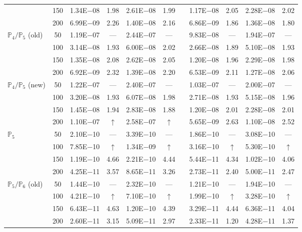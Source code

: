 \begin{table}[H]
{\begin{tabular}{@{}l c c c c c c c c c c@{}}
 & 150 & 1.34E$-$08 & 1.98  & 2.61E$-$08 & 1.99 &  & 1.17E$-$08 & 2.05 & 2.28E$-$08 & 2.02\\
 & 200 & 6.99E$-$09 & 2.26  & 1.40E$-$08 & 2.16 &  & 6.86E$-$09 & 1.86 & 1.36E$-$08 & 1.80\\
\midrule
\multirow{4}{*}{$\mathbb{P}_{4}/\mathbb{P}_{5}$ (old)}
 & 50 & 1.19E$-$07 & ---  & 2.44E$-$07 & --- &  & 9.83E$-$08 & --- & 1.94E$-$07 & ---\\
 & 100 & 3.14E$-$08 & 1.93  & 6.00E$-$08 & 2.02 &  & 2.66E$-$08 & 1.89 & 5.10E$-$08 & 1.93\\
 & 150 & 1.35E$-$08 & 2.08  & 2.62E$-$08 & 2.05 &  & 1.20E$-$08 & 1.96 & 2.29E$-$08 & 1.98\\
 & 200 & 6.92E$-$09 & 2.32  & 1.39E$-$08 & 2.20 &  & 6.53E$-$09 & 2.11 & 1.27E$-$08 & 2.06\\
\midrule
\multirow{4}{*}{$\mathbb{P}_{4}/\mathbb{P}_{5}$ (new)}
 & 50 & 1.22E$-$07 & ---  & 2.40E$-$07 & --- &  & 1.03E$-$07 & --- & 2.00E$-$07 & ---\\
 & 100 & 3.20E$-$08 & 1.93  & 6.07E$-$08 & 1.98 &  & 2.71E$-$08 & 1.93 & 5.15E$-$08 & 1.96\\
 & 150 & 1.45E$-$08 & 1.94  & 2.83E$-$08 & 1.88 &  & 1.20E$-$08 & 2.01 & 2.28E$-$08 & 2.01\\
 & 200 & 1.10E$-$07 & $\uparrow$  & 2.58E$-$07 & $\uparrow$ &  & 5.65E$-$09 & 2.63 & 1.10E$-$08 & 2.52\\
\midrule
\multirow{4}{*}{$\mathbb{P}_{5}$}
 & 50 & 2.10E$-$10 & ---  & 3.39E$-$10 & --- &  & 1.86E$-$10 & --- & 3.08E$-$10 & ---\\
 & 100 & 7.85E$-$10 & $\uparrow$  & 1.34E$-$09 & $\uparrow$ &  & 3.16E$-$10 & $\uparrow$ & 5.30E$-$10 & $\uparrow$\\
 & 150 & 1.19E$-$10 & 4.66  & 2.21E$-$10 & 4.44 &  & 5.44E$-$11 & 4.34 & 1.02E$-$10 & 4.06\\
 & 200 & 4.25E$-$11 & 3.57  & 8.65E$-$11 & 3.26 &  & 2.73E$-$11 & 2.40 & 5.00E$-$11 & 2.47\\
\midrule
\multirow{4}{*}{$\mathbb{P}_{5}/\mathbb{P}_{6}$ (old)}
 & 50 & 1.44E$-$10 & ---  & 2.32E$-$10 & --- &  & 1.21E$-$10 & --- & 1.94E$-$10 & ---\\
 & 100 & 4.21E$-$10 & $\uparrow$  & 7.10E$-$10 & $\uparrow$ &  & 1.99E$-$10 & $\uparrow$ & 3.28E$-$10 & $\uparrow$\\
 & 150 & 6.43E$-$11 & 4.63  & 1.20E$-$10 & 4.39 &  & 3.29E$-$11 & 4.44 & 6.36E$-$11 & 4.04\\
 & 200 & 2.60E$-$11 & 3.15  & 5.09E$-$11 & 2.97 &  & 2.33E$-$11 & 1.20 & 4.28E$-$11 & 1.37\\

\end{tabular}}
\end{table}

